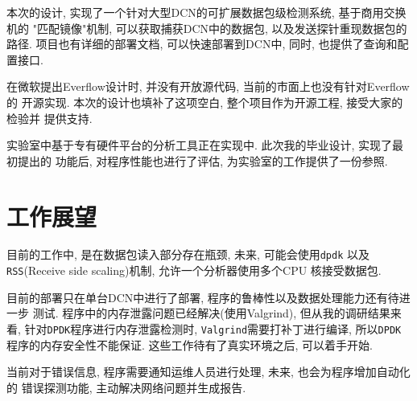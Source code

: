   本次的设计, 实现了一个针对大型DCN的可扩展数据包级检测系统, 基于商用交换机的
"匹配镜像"机制, 可以获取捕获DCN中的数据包, 以及发送探针重现数据包的路径.
项目也有详细的部署文档, 可以快速部署到DCN中, 同时, 也提供了查询和配置接口.

  在微软提出Everflow设计时, 并没有开放源代码, 当前的市面上也没有针对Everflow的
开源实现. 本次的设计也填补了这项空白, 整个项目作为开源工程, 接受大家的检验并
提供支持.

  实验室中基于专有硬件平台的分析工具正在实现中. 此次我的毕业设计, 实现了最初提出的
功能后, 对程序性能也进行了评估, 为实验室的工作提供了一份参照.

\section{工作展望}

  目前的工作中, 是在数据包读入部分存在瓶颈, 未来, 可能会使用\texttt{dpdk}
以及\texttt{RSS}(Receive side scaling)\cite{rss}机制, 允许一个分析器使用多个CPU
核接受数据包.

  目前的部署只在单台DCN中进行了部署, 程序的鲁棒性以及数据处理能力还有待进一步
测试. 程序中的内存泄露问题已经解决(使用Valgrind\cite{Valgrind}),
但从我的调研结果来看, 针对\texttt{DPDK}程序进行内存泄露检测时,
\texttt{Valgrind}需要打补丁进行编译, 所以\texttt{DPDK}程序的内存安全性不能保证.
这些工作待有了真实环境之后, 可以着手开始.

  当前对于错误信息, 程序需要通知运维人员进行处理, 未来, 也会为程序增加自动化的
错误探测功能, 主动解决网络问题并生成报告.
